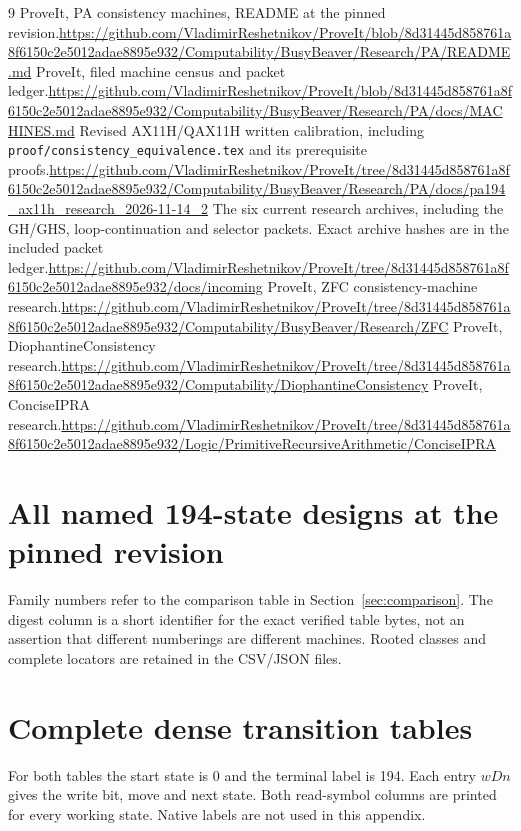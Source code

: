 \documentclass[11pt,letterpaper]{article}
\newcommand{\file}[1]{\nolinkurl{#1}}
\begin{document}
\begin{thebibliography}{9}
 ProveIt, PA consistency machines, README at the pinned
revision.\newline\url{https://github.com/VladimirReshetnikov/ProveIt/blob/8d31445d858761a8f6150c2e5012adae8895e932/Computability/BusyBeaver/Research/PA/README.md}
 ProveIt, filed machine census and packet ledger.\newline\url{https://github.com/VladimirReshetnikov/ProveIt/blob/8d31445d858761a8f6150c2e5012adae8895e932/Computability/BusyBeaver/Research/PA/docs/MACHINES.md}
 Revised AX11H/QAX11H written calibration, including
\file{proof/consistency_equivalence.tex} and its prerequisite proofs.\newline\url{https://github.com/VladimirReshetnikov/ProveIt/tree/8d31445d858761a8f6150c2e5012adae8895e932/Computability/BusyBeaver/Research/PA/docs/pa194_ax11h_research_2026-11-14_2}
 The six current research archives, including the GH/GHS,
loop-continuation and selector packets. Exact archive hashes are in the
included packet ledger.\newline\url{https://github.com/VladimirReshetnikov/ProveIt/tree/8d31445d858761a8f6150c2e5012adae8895e932/docs/incoming}
 ProveIt, ZFC consistency-machine research.\newline\url{https://github.com/VladimirReshetnikov/ProveIt/tree/8d31445d858761a8f6150c2e5012adae8895e932/Computability/BusyBeaver/Research/ZFC}
 ProveIt, DiophantineConsistency research.\newline\url{https://github.com/VladimirReshetnikov/ProveIt/tree/8d31445d858761a8f6150c2e5012adae8895e932/Computability/DiophantineConsistency}
 ProveIt, ConciseIPRA research.\newline\url{https://github.com/VladimirReshetnikov/ProveIt/tree/8d31445d858761a8f6150c2e5012adae8895e932/Logic/PrimitiveRecursiveArithmetic/ConciseIPRA}
\end{thebibliography}

\clearpage\appendix
\section{All named 194-state designs at the pinned revision}
\label{app:named}
Family numbers refer to the comparison table in Section~\ref{sec:comparison}.
The digest column is a short identifier for the exact verified table bytes,
not an assertion that different numberings are different machines. Rooted
classes and complete locators are retained in the CSV/JSON files.


\clearpage
\section{Complete dense transition tables}
\label{app:tables}
For both tables the start state is 0 and the terminal label is 194. Each
entry $wDn$ gives the write bit, move and next state. Both read-symbol
columns are printed for every working state. Native labels are not used
in this appendix.

\end{document}

